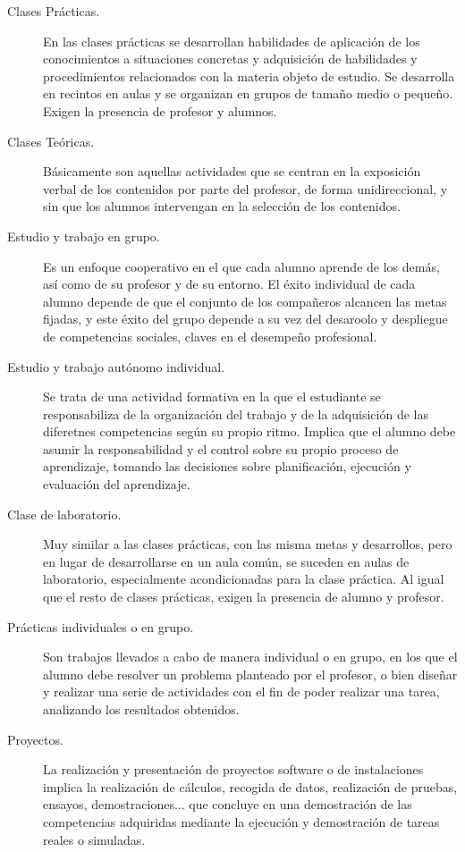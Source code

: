 \begin{description}
		\begin{description}
			\item [Clases Prácticas.] En las clases prácticas se desarrollan habilidades de aplicación de los conocimientos a situaciones concretas y adquisición de habilidades y procedimientos relacionados con la materia objeto de estudio. Se desarrolla en recintos en aulas y se organizan en grupos de tamaño medio o pequeño. Exigen la presencia de profesor y alumnos.
			\item [Clases Teóricas.] Básicamente son aquellas actividades que se centran en la exposición verbal de los contenidos por parte del profesor, de forma unidireccional, y sin que los alumnos intervengan en la selección de los contenidos.
			\item [Estudio y trabajo en grupo.] Es un enfoque cooperativo en el que cada alumno aprende de los demás, así como de su profesor y de su entorno. El éxito individual de cada alumno depende de que el conjunto de los compañeros alcancen las metas fijadas, y este éxito del grupo depende a su vez del desaroolo y despliegue de competencias sociales, claves en el desempeño profesional.
			\item [Estudio y trabajo autónomo individual.] Se trata de una actividad formativa en la que el estudiante se responsabiliza de la organización del trabajo y de la adquisición de las diferetnes competencias según su propio ritmo. Implica que el alumno debe asumir la responsabilidad y el control sobre su propio proceso de aprendizaje, tomando las decisiones sobre planificación, ejecución y evaluación del aprendizaje.
			\item [Clase de laboratorio.] Muy similar a las clases prácticas, con las misma metas y desarrollos, pero en lugar de desarrollarse en un aula común, se suceden en aulas de laboratorio, especialmente acondicionadas para la clase práctica. Al igual que el resto de clases prácticas, exigen la presencia de alumno y profesor.
			\item [Prácticas individuales o en grupo.] Son trabajos llevados a cabo de manera individual o en grupo, en los que el alumno debe resolver un problema planteado por el profesor, o bien diseñar y realizar una serie de actividades con el fin de poder realizar una tarea, analizando los resultados obtenidos.
			\item [Proyectos.] La realización y presentación de proyectos software o de instalaciones implica la realización de cálculos, recogida de datos, realización de pruebas, ensayos, demostraciones... que concluye en una demostración de las competencias adquiridas mediante la ejecución y demostración de tareas reales o simuladas.

\end{description}
\end{description}
